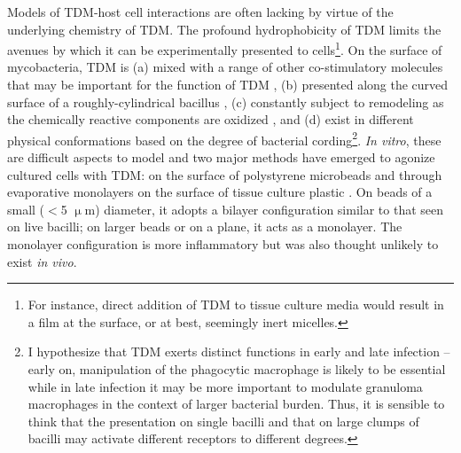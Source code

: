 Models of TDM\hyp{}host cell interactions are often lacking by virtue of the underlying chemistry of TDM. The profound hydrophobicity of TDM limits the avenues by which it can be experimentally presented to cells\footnote{For instance, direct addition of TDM to tissue culture media would result in a film at the surface, or at best, seemingly inert micelles.}. On the surface of mycobacteria, TDM is (a) mixed with a range of other co\hyp{}stimulatory molecules that may be important for the function of TDM \citep{Rhoades2003, Mazurek2012, Torrelles2010}, (b) presented along the curved surface of a roughly\hyp{}cylindrical bacillus \citep{McCarter1935},  (c) constantly subject to remodeling as the chemically reactive components are oxidized \citep{Hett2010, Meniche2014, Shaku2020}, and (d) exist in different physical conformations based on the degree of bacterial cording\footnote{I hypothesize that TDM exerts distinct functions in early and late infection -- early on, manipulation of the phagocytic macrophage is likely to be essential while in late infection it may be more important to modulate granuloma macrophages in the context of larger bacterial burden. Thus, it is sensible to think that the presentation on single bacilli and that on large clumps of bacilli may activate different receptors to different degrees.}. \textit{In vitro}, these are difficult aspects to model and two major methods have emerged to agonize cultured cells with TDM: on the surface of polystyrene microbeads \citep{Bloch1950, Bowdish2009, Indrigo2003, Retzinger1982, Behling1993, Geisel2005} and through evaporative monolayers on the surface of tissue culture plastic \citep{Schabbing1994, Harland2008, Hunter2006a, Ishikawa2009, Zhao2014, Miyake2013}. On beads of a small ($<$5 $\upmu$m) diameter, it adopts a bilayer configuration similar to that seen on live bacilli; on larger beads or on a plane, it acts as a monolayer. The monolayer configuration is more inflammatory but was also thought unlikely to exist \textit{in vivo}. 

